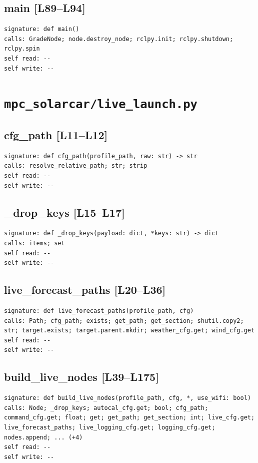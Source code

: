 \documentclass[a4paper,10pt,oneside]{book}
\begin{document}
\subsection*{main [L89--L94]}
\begin{lstlisting}[numbers=none]
signature: def main()
calls: GradeNode; node.destroy_node; rclpy.init; rclpy.shutdown; rclpy.spin
self read: --
self write: --
\end{lstlisting}
\section{\texttt{mpc\_solarcar/live\_launch.py}}
\subsection*{cfg\_path [L11--L12]}
\begin{lstlisting}[numbers=none]
signature: def cfg_path(profile_path, raw: str) -> str
calls: resolve_relative_path; str; strip
self read: --
self write: --
\end{lstlisting}
\subsection*{\_drop\_keys [L15--L17]}
\begin{lstlisting}[numbers=none]
signature: def _drop_keys(payload: dict, *keys: str) -> dict
calls: items; set
self read: --
self write: --
\end{lstlisting}
\subsection*{live\_forecast\_paths [L20--L36]}
\begin{lstlisting}[numbers=none]
signature: def live_forecast_paths(profile_path, cfg)
calls: Path; cfg_path; exists; get_path; get_section; shutil.copy2; str; target.exists; target.parent.mkdir; weather_cfg.get; wind_cfg.get
self read: --
self write: --
\end{lstlisting}
\subsection*{build\_live\_nodes [L39--L175]}
\begin{lstlisting}[numbers=none]
signature: def build_live_nodes(profile_path, cfg, *, use_wifi: bool)
calls: Node; _drop_keys; autocal_cfg.get; bool; cfg_path; command_cfg.get; float; get; get_path; get_section; int; live_cfg.get; live_forecast_paths; live_logging_cfg.get; logging_cfg.get; nodes.append; ... (+4)
self read: --
self write: --
\end{lstlisting}
\end{document}
